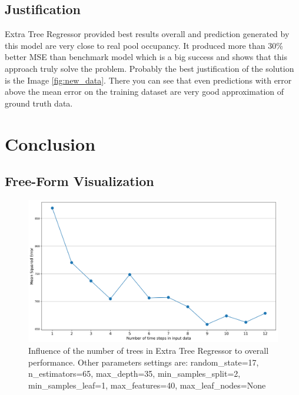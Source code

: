 \documentclass{article}
\begin{document}
\subsection{Justification}
Extra Tree Regressor provided best results overall and prediction generated by this model are very close to real pool occupancy. It produced more than 30\% better MSE than benchmark model which is a big success and shows that this approach truly solve the problem. Probably the best justification of the solution is the Image \ref{fig:new_data}. There you can see that even predictions with error above the mean error on the training dataset are very good approximation of ground truth data. 

\section{Conclusion}

\subsection{Free-Form Visualization}

\begin{figure}[h!]
\centering
\includegraphics[width=16cm]{imgs/ts_vs_mse.png}
\caption{Influence of the number of trees in Extra Tree Regressor to overall performance. Other parameters settings are: random\_state=17, n\_estimators=65, max\_depth=35, min\_samples\_split=2, min\_samples\_leaf=1, max\_features=40, max\_leaf\_nodes=None}
\label{fig:influence_trees}
\end{figure}
\end{document}
